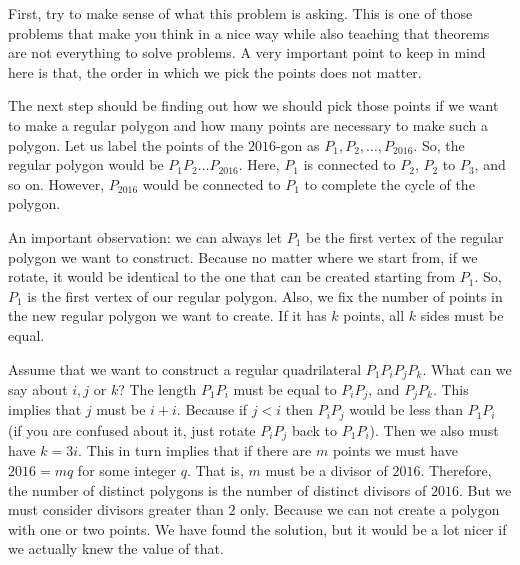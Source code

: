 		\begin{solution}
			First, try to make sense of what this problem is asking. This is one of those problems that make you think in a nice way while also teaching that theorems are not everything to solve problems. A very important point to keep in mind here is that, the order in which we pick the points does not matter.

			The next step should be finding out how we should pick those points if we want to make a regular polygon and how many points are necessary to make such a polygon. Let us label the points of the $2016$-gon as $P_1,P_2,\ldots,P_{2016}$. So, the regular polygon would be $P_1P_2\ldots P_{2016}$. Here, $P_1$ is connected to $P_2$, $P_2$ to $P_3$, and so on. However, $P_{2016}$ would be connected to $P_1$ to complete the cycle of the polygon.

			An important observation: we can always let $P_1$ be the first vertex of the regular polygon we want to construct. Because no matter where we start from, if we rotate, it would be identical to the one that can be created starting from $P_1$. So, $P_1$ is the first vertex of our regular polygon. Also, we fix the number of points in the new regular polygon we want to create. If it has $k$ points, all $k$ sides must be equal.

			Assume that we want to construct a regular quadrilateral $P_1P_iP_jP_k$. What can we say about $i, j$ or $k$? The length $P_1P_i$ must be equal to $P_iP_j$, and $P_jP_k$. This implies that $j$ must be $i+i$. Because if $j<i$ then $P_iP_j$ would be less than $P_1P_i$ (if you are confused about it, just rotate $P_iP_j$ back to $P_1P_i$). Then we also must have $k=3i$. This in turn implies that if there are $m$ points we must have $2016=mq$ for some integer $q$. That is, $m$ must be a divisor of $2016$. Therefore, the number of distinct polygons is the number of distinct divisors of $2016$. But we must consider divisors greater than $2$ only. Because we can not create a polygon with one or two points. We have found the solution, but it would be a lot nicer if we actually knew the value of that.
		\end{solution}
